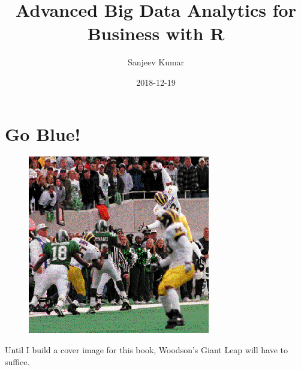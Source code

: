\documentclass[]{krantz}
\title{Advanced Big Data Analytics for Business with R}
\author{Sanjeev Kumar}
\date{2018-12-19}
\renewenvironment{quote}{\begin{VF}}{\end{VF}}
\theoremstyle{definition}
\theoremstyle{definition}
\theoremstyle{definition}
\theoremstyle{remark}
\begin{document}
\maketitle


\thispagestyle{empty}

\begin{center}

\par{}

\end{center}

\setlength{\abovedisplayskip}{-5pt}
\setlength{\abovedisplayshortskip}{-5pt}

{
\hypersetup{linkcolor=black}
\setcounter{tocdepth}{2}
\tableofcontents
}
\listoftables
\listoffigures
\chapter*{Go Blue!}\label{go-blue}


\begin{figure}
\centering
\includegraphics{images/woodson.png}
\caption{}
\end{figure}

\begin{quote}
Until I build a cover image for this book, Woodson's Giant Leap will
have to suffice.
\end{quote}
\end{document}
